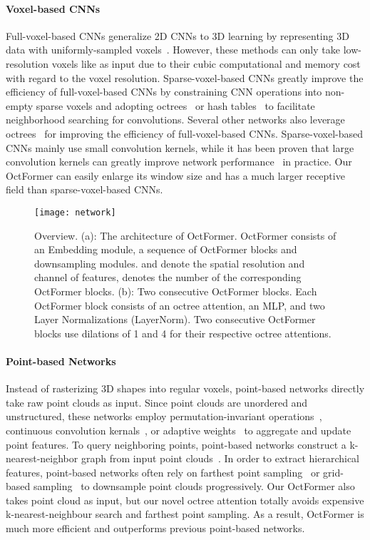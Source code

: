 \documentclass[acmtog,screen,authorversion]{acmart}
\begin{document}
\paragraph{Voxel-based CNNs}
Full-voxel-based CNNs generalize 2D CNNs to 3D learning by representing 3D data with uniformly-sampled voxels~\cite{Wu2015,Maturana2015,Qi2016}.
However, these methods can only take low-resolution voxels like  as input due to their cubic computational and memory cost with regard to the voxel resolution.
Sparse-voxel-based CNNs greatly improve the efficiency of full-voxel-based CNNs by constraining CNN operations into non-empty sparse voxels and adopting octrees~\cite{Wang2017,Wang2018a} or hash tables~\cite{Graham2018,Shao2018,Choy2019} to facilitate neighborhood searching for convolutions.
Several other networks also leverage octrees~\cite{Riegler2017,Riegler2017a,Lei2019} for improving the efficiency of full-voxel-based CNNs.
Sparse-voxel-based CNNs mainly use small convolution kernels, while it has been proven that large convolution kernels can greatly improve network performance~\cite{Chen2022} in practice.
Our OctFormer can easily enlarge its window size and has a much larger receptive field than sparse-voxel-based CNNs.


\begin{figure*}[ht]
  \centering
  \texttt{[image: network]}
  \caption{Overview.
  (a): The architecture of OctFormer. OctFormer consists of an Embedding module, a sequence of OctFormer blocks and downsampling modules.
   and  denote the spatial resolution and channel of features,  denotes the number of the corresponding OctFormer blocks.  
  (b): Two consecutive OctFormer blocks. 
  Each OctFormer block consists of an octree attention, an MLP, and two Layer Normalizations (LayerNorm). Two consecutive OctFormer blocks use dilations of 1 and 4 for their respective octree attentions. }
  \label{fig:octformer}
\end{figure*}


\paragraph{Point-based Networks}
Instead of rasterizing 3D shapes into regular voxels, point-based networks directly take raw point clouds as input.
Since point clouds are unordered and unstructured, these networks employ permutation-invariant operations~\cite{Qi2017a,Qi2017,Li2018}, continuous convolution kernals~\cite{Atzmon2018,Thomas2019,Fey2018}, or adaptive weights~\cite{Simonovsky2017,Wu2019a} to aggregate and update point features.
To query neighboring points, point-based networks construct a k-nearest-neighbor graph from input point clouds~\cite{Qi2017,Li2018,Xu2018,Simonovsky2017,Fey2018}.
In order to extract hierarchical features, point-based networks often rely on farthest point sampling~\cite{Qi2017} or grid-based sampling~\cite{Thomas2019,Hu2019} to downsample point clouds progressively.
Our OctFormer also takes point cloud as input, but our novel octree attention totally avoids expensive k-nearest-neighbour search and farthest point sampling.
As a result, OctFormer is much more efficient and outperforms previous point-based networks.
\end{document}
